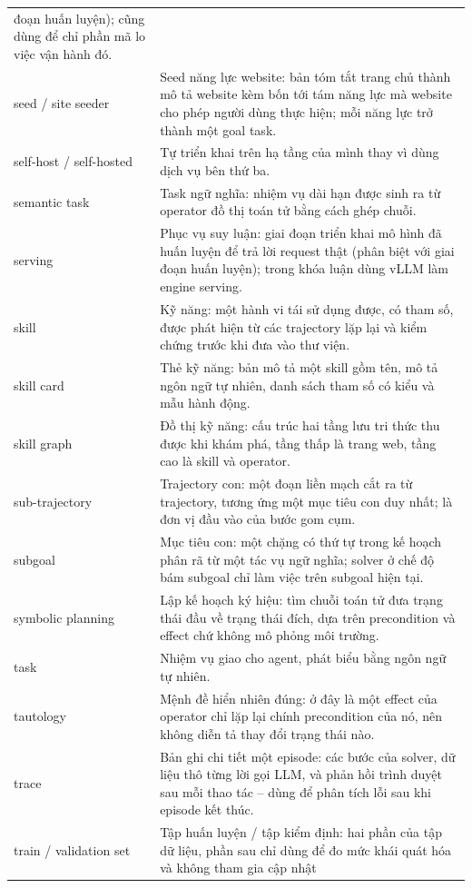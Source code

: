 \begin{longtable}{L{4.2cm} L{9.8cm}}
đoạn huấn luyện); cũng dùng để chỉ phần mã lo việc vận hành đó. \\
seed / site seeder & Seed năng lực website: bản tóm tắt trang chủ thành mô tả website kèm bốn tới tám năng lực mà website cho phép người dùng thực hiện; mỗi năng lực trở thành một goal task. \\
self-host / self-hosted & Tự triển khai trên hạ tầng của mình thay vì dùng
dịch vụ bên thứ ba. \\
semantic task & Task ngữ nghĩa: nhiệm vụ dài hạn được sinh ra từ operator
đồ thị toán tử bằng cách ghép chuỗi. \\
serving & Phục vụ suy luận: giai đoạn triển khai mô hình đã huấn luyện để
trả lời request thật (phân biệt với giai đoạn huấn luyện); trong khóa luận
dùng vLLM làm engine serving. \\
skill & Kỹ năng: một hành vi tái sử dụng được, có tham số, được phát hiện
từ các trajectory lặp lại và kiểm chứng trước khi đưa vào thư viện. \\
skill card & Thẻ kỹ năng: bản mô tả một skill gồm tên, mô tả ngôn ngữ tự
nhiên, danh sách tham số có kiểu và mẫu hành động. \\
skill graph & Đồ thị kỹ năng: cấu trúc hai tầng lưu tri thức thu được khi
khám phá, tầng thấp là trang web, tầng cao là skill và operator. \\
sub-trajectory & Trajectory con: một đoạn liền mạch cắt ra từ trajectory,
tương ứng một mục tiêu con duy nhất; là đơn vị đầu vào của bước gom cụm. \\
subgoal & Mục tiêu con: một chặng có thứ tự trong kế hoạch phân rã từ một tác vụ ngữ nghĩa; solver ở chế độ bám subgoal chỉ làm việc trên subgoal hiện tại. \\
symbolic planning & Lập kế hoạch ký hiệu: tìm chuỗi toán tử đưa trạng thái
đầu về trạng thái đích, dựa trên precondition và effect chứ không mô phỏng
môi trường. \\
task & Nhiệm vụ giao cho agent, phát biểu bằng ngôn ngữ tự nhiên. \\
tautology & Mệnh đề hiển nhiên đúng: ở đây là một effect của operator chỉ
lặp lại chính precondition của nó, nên không diễn tả thay đổi trạng thái
nào. \\
trace & Bản ghi chi tiết một episode: các bước của solver, dữ liệu thô
từng lời gọi LLM, và phản hồi trình duyệt sau mỗi thao tác -- dùng để phân
tích lỗi sau khi episode kết thúc. \\
train / validation set & Tập huấn luyện / tập kiểm định: hai phần của tập dữ
liệu, phần sau chỉ dùng để đo mức khái quát hóa và không tham gia cập nhật

\end{longtable}
